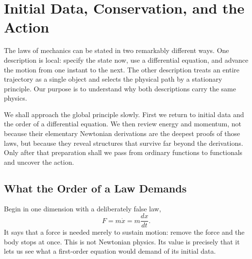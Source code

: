 \chapter{Initial Data, Conservation, and the Action}

The laws of mechanics can be stated in two remarkably different ways. One
description is local: specify the state now, use a differential equation, and
advance the motion from one instant to the next. The other description treats
an entire trajectory as a single object and selects the physical path by a
stationary principle. Our purpose is to understand why both descriptions carry
the same physics.

We shall approach the global principle slowly. First we return to initial data
and the order of a differential equation. We then review energy and momentum,
not because their elementary Newtonian derivations are the deepest proofs of
those laws, but because they reveal structures that survive far beyond the
derivations. Only after that preparation shall we pass from ordinary functions
to functionals and uncover the action.

\section{What the Order of a Law Demands}

Begin in one dimension with a deliberately false law,
\begin{equation}
 F=m\dot x=m\frac{dx}{dt}.
 \label{eq:l02-aristotle}
\end{equation}
It says that a force is needed merely to sustain motion: remove the force and
the body stops at once. This is not Newtonian physics. Its value is precisely
that it lets us see what a first-order equation would demand of its initial
data.

